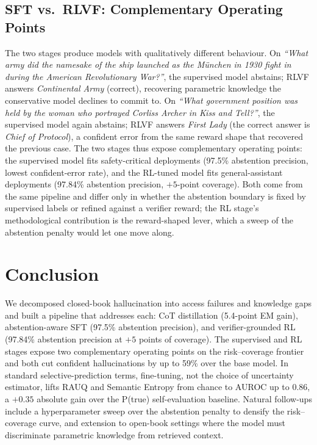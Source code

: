 \documentclass[11pt]{article}
\begin{document}
\subsection{SFT vs.\ RLVF: Complementary Operating Points}

The two stages produce models with qualitatively different behaviour. On \emph{``What army did the namesake of the ship launched as the M\"unchen in 1930 fight in during the American Revolutionary War?''}, the supervised model abstains; RLVF answers \emph{Continental Army} (correct), recovering parametric knowledge the conservative model declines to commit to. On \emph{``What government position was held by the woman who portrayed Corliss Archer in \textit{Kiss and Tell}?''}, the supervised model again abstains; RLVF answers \emph{First Lady} (the correct answer is \emph{Chief of Protocol}), a confident error from the same reward shape that recovered the previous case. The two stages thus expose complementary operating points: the supervised model fits safety-critical deployments (97.5\% abstention precision, lowest confident-error rate), and the RL-tuned model fits general-assistant deployments (97.84\% abstention precision, $+5$-point coverage). Both come from the same pipeline and differ only in whether the abstention boundary is fixed by supervised labels or refined against a verifier reward; the RL stage's methodological contribution is the reward-shaped lever, which a sweep of the abstention penalty would let one move along.

\section{Conclusion}
We decomposed closed-book hallucination into access failures and knowledge gaps and built a pipeline that addresses each: CoT distillation (5.4-point EM gain), abstention-aware SFT (97.5\% abstention precision), and verifier-grounded RL (97.84\% abstention precision at $+5$ points of coverage). The supervised and RL stages expose two complementary operating points on the risk--coverage frontier and both cut confident hallucinations by up to 59\% over the base model. In standard selective-prediction terms, fine-tuning, not the choice of uncertainty estimator, lifts RAUQ and Semantic Entropy from chance to AUROC up to $0.86$, a $+0.35$ absolute gain over the P(true) self-evaluation baseline. Natural follow-ups include a hyperparameter sweep over the abstention penalty to densify the risk--coverage curve, and extension to open-book settings where the model must discriminate parametric knowledge from retrieved context.
\end{document}
